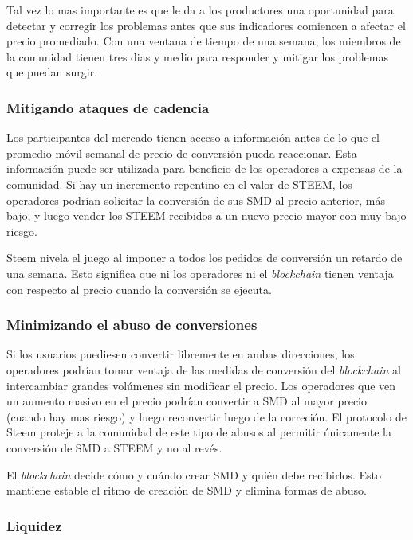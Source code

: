\documentclass[a4paper,titlepage,final]{article}
\begin{document}
Tal vez lo mas importante es que le da a los productores una oportunidad para detectar y corregir los problemas antes que sus indicadores comiencen a afectar el precio promediado. Con una ventana de tiempo de una semana, los miembros de la comunidad tienen tres dias y medio para responder y mitigar los problemas que puedan surgir.

\subsubsection{Mitigando ataques de cadencia}

Los participantes del mercado tienen acceso a información antes de lo que el promedio móvil semanal de precio de conversión pueda reaccionar. Esta información puede ser utilizada para beneficio de los operadores a expensas de la comunidad. Si hay un incremento repentino en el valor de STEEM, los operadores podrían solicitar la conversión de sus SMD al precio anterior, más bajo, y luego vender los STEEM recibidos a un nuevo precio mayor con muy bajo riesgo.

Steem nivela el juego al imponer a todos los pedidos de conversión un retardo de una semana. Esto significa que ni los operadores ni el \textit{blockchain} tienen ventaja con respecto al precio cuando la conversión se ejecuta.

\subsubsection{Minimizando el abuso de conversiones}

Si los usuarios puediesen convertir libremente en ambas direcciones, los operadores podrían tomar ventaja de las medidas de conversión del \textit{blockchain} al intercambiar grandes volúmenes sin modificar el precio. Los operadores que ven un aumento masivo en el precio podrían convertir a SMD al mayor precio (cuando hay mas riesgo) y luego reconvertir luego de la correción. El protocolo de Steem proteje a la comunidad de este tipo de abusos al permitir únicamente la conversión de SMD a STEEM y no al revés.

El \textit{blockchain} decide cómo y cuándo crear SMD y quién debe recibirlos. Esto mantiene estable el ritmo de creación de SMD y elimina formas de abuso.

\subsubsection{Liquidez}
\end{document}
